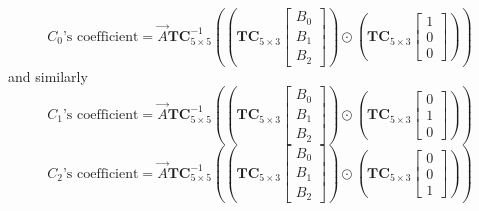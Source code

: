 \documentclass[
11pt,notheorems,hyperref={pdfauthor=whatever}
]{beamer}
\begin{document}
\begin{frame}
    \[
    C_{0}\text{'s coefficient} = \vec{A} \mathbf{TC}_{5\times 5}^{-1} \left(\left(\mathbf{TC}_{5\times 3}\begin{bmatrix}B_{0}\\B_{1}\\B_{2}\end{bmatrix}\right)\odot \left(\mathbf{TC}_{5\times 3}\begin{bmatrix}1\\0\\0\end{bmatrix}\right)\right)
    \]
    and similarly
    \[
    C_{1}\text{'s coefficient} = \vec{A} \mathbf{TC}_{5\times 5}^{-1} \left(\left(\mathbf{TC}_{5\times 3}\begin{bmatrix}B_{0}\\B_{1}\\B_{2}\end{bmatrix}\right)\odot \left(\mathbf{TC}_{5\times 3}\begin{bmatrix}0\\1\\0\end{bmatrix}\right)\right)
    \]
    \[
    C_{2}\text{'s coefficient} = \vec{A} \mathbf{TC}_{5\times 5}^{-1} \left(\left(\mathbf{TC}_{5\times 3}\begin{bmatrix}B_{0}\\B_{1}\\B_{2}\end{bmatrix}\right)\odot \left(\mathbf{TC}_{5\times 3}\begin{bmatrix}0\\0\\1\end{bmatrix}\right)\right)
    \]
\end{frame}
\end{document}
